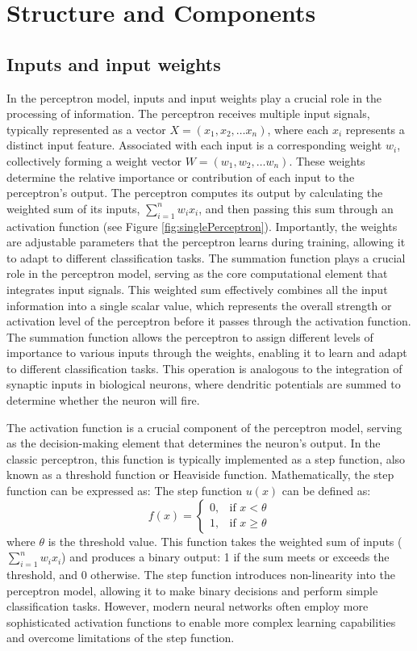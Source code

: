 \section{Structure and Components}
\subsection{Inputs and input weights}
In the perceptron model, inputs and input weights play a crucial role in the processing of information. The perceptron receives multiple input signals, typically represented as a vector $X=(x_1, x_2, \ldots x_n)$, where each $x_i$ represents a distinct input feature. Associated with each input is a corresponding weight $w_i$, collectively forming a weight vector $W=(w_1, w_2,\ldots w_n)$. These weights determine the relative importance or contribution of each input to the perceptron's output. The perceptron computes its output by calculating the weighted sum of its inputs, $\sum_{i=1}^nw_ix_i$, and then passing this sum through an activation function (see Figure \ref{fig:singlePerceptron}). Importantly, the weights are adjustable parameters that the perceptron learns during training, allowing it to adapt to different classification tasks. The summation function plays a crucial role in the perceptron model, serving as the core computational element that integrates input signals. This weighted sum effectively combines all the input information into a single scalar value, which represents the overall strength or activation level of the perceptron before it passes through the activation function. The summation function allows the perceptron to assign different levels of importance to various inputs through the weights, enabling it to learn and adapt to different classification tasks. This operation is analogous to the integration of synaptic inputs in biological neurons, where dendritic potentials are summed to determine whether the neuron will fire.

The activation function is a crucial component of the perceptron model, serving as the decision-making element that determines the neuron's output. In the classic perceptron, this function is typically implemented as a step function, also known as a threshold function or Heaviside function. Mathematically, the step function can be expressed as:
The step function \( u(x) \) can be defined as:
\[
f(x) =
\begin{cases} 
0, & \text{if } x < \theta \\ 
1, & \text{if } x \geq \theta 
\end{cases}
\]
where $\theta$ is the threshold value. This function takes the weighted sum of inputs ($\sum_{i=1}^n w_ix_i$) and produces a binary output: 1 if the sum meets or exceeds the threshold, and 0 otherwise. The step function introduces non-linearity into the perceptron model, allowing it to make binary decisions and perform simple classification tasks. However, modern neural networks often employ more sophisticated activation functions to enable more complex learning capabilities and overcome limitations of the step function.

